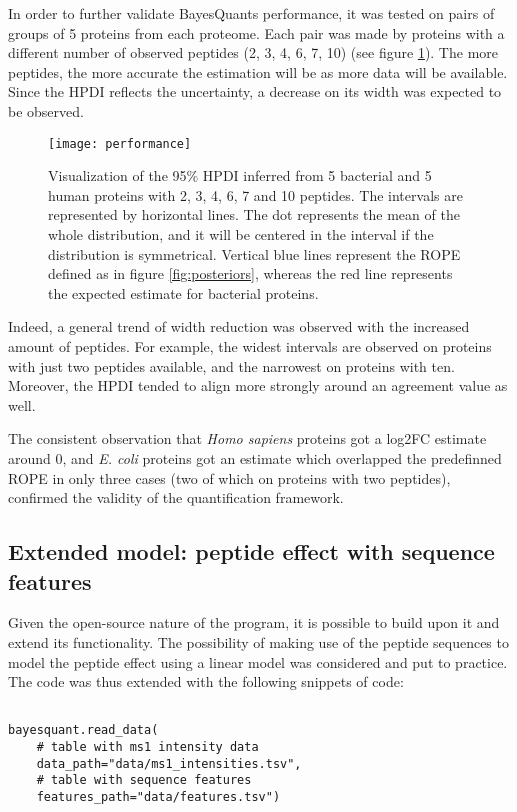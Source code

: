 In order to further validate BayesQuant\textquotesingle s performance, it was tested on pairs of groups of 5 proteins from each proteome. Each pair was made by proteins with a different number of observed peptides (2, 3, 4, 6, 7, 10) (see figure \ref{fig:dumbbell}). The more peptides, the more accurate the estimation will be as more data will be available. Since the \ac{HPDI} reflects the uncertainty, a decrease on its width was expected to be observed.

\begin{figure}[!h]
\centering
\texttt{[image: performance]}
\caption{Visualization of the 95\% \ac{HPDI} inferred from 5 bacterial and 5 human proteins with 2, 3, 4, 6, 7 and 10 peptides. The intervals are represented by horizontal lines. The dot represents the mean of the whole distribution, and it will be centered in the interval if the distribution is symmetrical. Vertical blue lines represent the ROPE defined as in figure \ref{fig:posteriors}, whereas the red line represents the expected estimate for bacterial proteins.}
\label{fig:dumbbell}
\end{figure}


Indeed, a general trend of width reduction was observed with the increased amount of peptides. For example, the widest intervals are observed on proteins with just two peptides available, and the narrowest on proteins with ten. Moreover, the \ac{HPDI} tended to align more strongly around an agreement value as well. 

The consistent observation that \textit{Homo sapiens} proteins got a \ac{log2FC} estimate around 0, and \textit{E. coli} proteins got an estimate which overlapped the predefinned \ac{ROPE} in only three cases (two of which on proteins with two peptides), confirmed the validity of the quantification framework.

\subsection{Extended model: peptide effect with sequence features}
\label{subsec:extended_model}

Given the open-source nature of the program, it is possible to build upon it and extend its functionality. The possibility of making use of the peptide sequences to model the peptide effect using a linear model was considered and put to practice. The code was thus extended with the following snippets of code:

\begin{verbatim}

bayesquant.read_data(
    # table with ms1 intensity data
    data_path="data/ms1_intensities.tsv",
    # table with sequence features
    features_path="data/features.tsv")
\end{verbatim}


